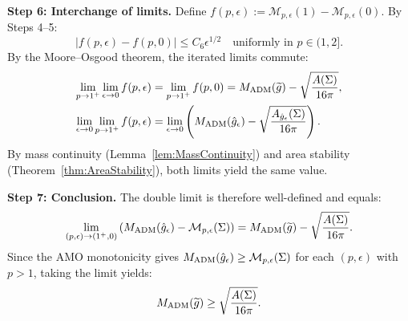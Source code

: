 \textbf{Step 6: Interchange of limits.}
Define $f(p, \epsilon) := \mathcal{M}_{p,\epsilon}(1) - \mathcal{M}_{p,\epsilon}(0)$. By Steps 4--5:
\begin{equation}
    |f(p, \epsilon) - f(p, 0)| \le C_6 \epsilon^{1/2} \quad \text{uniformly in } p \in (1, 2].
\end{equation}
By the Moore--Osgood theorem, the iterated limits commute:
\begin{align}
    \lim_{p \to 1^+} \lim_{\epsilon \to 0} f(p, \epsilon) &= \lim_{p \to 1^+} f(p, 0) = M_{\mathrm{ADM}}(\widetilde{g}) - \sqrt{\frac{A(\Sigma)}{16\pi}}, \\
    \lim_{\epsilon \to 0} \lim_{p \to 1^+} f(p, \epsilon) &= \lim_{\epsilon \to 0} \left( M_{\mathrm{ADM}}(\hat{g}_\epsilon) - \sqrt{\frac{A_{\hat{g}_\epsilon}(\Sigma)}{16\pi}} \right).
\end{align}
By mass continuity (Lemma~\ref{lem:MassContinuity}) and area stability (Theorem~\ref{thm:AreaStability}), both limits yield the same value.

\textbf{Step 7: Conclusion.}
The double limit is therefore well-defined and equals:
\begin{equation}
    \lim_{(p, \epsilon) \to (1^+, 0)} \left( M_{\mathrm{ADM}}(\hat{g}_\epsilon) - \mathcal{M}_{p,\epsilon}(\Sigma) \right) = M_{\mathrm{ADM}}(\widetilde{g}) - \sqrt{\frac{A(\Sigma)}{16\pi}}.
\end{equation}
Since the AMO monotonicity gives $M_{\mathrm{ADM}}(\hat{g}_\epsilon) \ge \mathcal{M}_{p,\epsilon}(\Sigma)$ for each $(p, \epsilon)$ with $p > 1$, taking the limit yields:
\begin{equation}
    M_{\mathrm{ADM}}(\widetilde{g}) \ge \sqrt{\frac{A(\Sigma)}{16\pi}}.
\end{equation}

